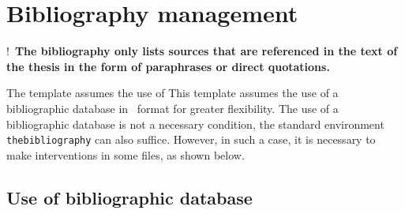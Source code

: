 \chapter{Bibliography management}

\lettrine[lines=2]{!}{~}\textbf{The bibliography only lists sources that are 
referenced in the text of the thesis in the form of paraphrases or direct 
quotations.}

The template assumes the use of This template assumes the use of a bibliographic 
database in \BibTeX\ format for greater flexibility. The use of a bibliographic 
database is not a necessary condition, the standard environment 
\texttt{thebibliography} can also suffice. However, in such a case, it is 
necessary to make interventions in some files, as shown below.

\section{Use of bibliographic database}

